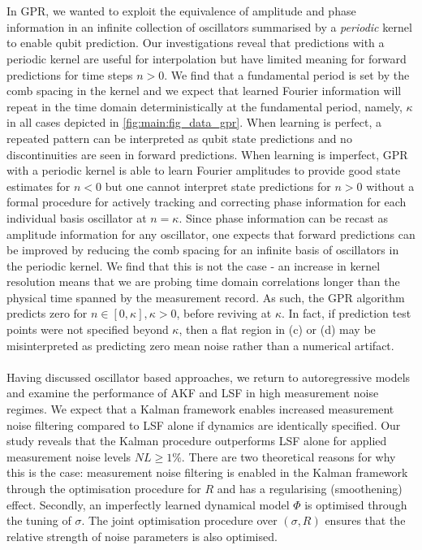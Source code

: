 \\
\\
In GPR, we wanted to exploit the equivalence of amplitude and phase information in an infinite collection of oscillators summarised by a \textit{periodic} kernel to enable qubit prediction. Our investigations reveal that predictions with a periodic kernel are useful for interpolation but have limited meaning for forward predictions for time steps $n >0$.  We find that a fundamental period is set by the comb spacing in the kernel and we expect that learned Fourier information will repeat in the time domain deterministically at the fundamental period, namely, $\kappa$ in all cases depicted in \cref{fig:main:fig_data_gpr}. When learning is perfect, a repeated pattern can be interpreted as qubit state predictions and no discontinuities are seen in forward predictions. When learning is imperfect, GPR  with a periodic kernel is able to learn Fourier amplitudes to provide good state estimates for $n<0$ but one cannot interpret state predictions for $n>0$ without a formal procedure for actively tracking and correcting phase information for each individual basis oscillator at $n= \kappa$. Since phase information can be recast as amplitude information for any oscillator, one expects that forward predictions can be improved by reducing the comb spacing for an infinite basis of oscillators in the periodic kernel.  We find that this is not the case - an increase in kernel resolution means that we are probing time domain correlations longer than the physical time spanned by the measurement record. As such, the GPR algorithm predicts zero for $n \in [0, \kappa], \kappa > 0$, before reviving at $\kappa$.  In fact, if prediction test points were not specified beyond $\kappa$, then a flat region in (c) or (d) may be misinterpreted as predicting zero mean noise rather than a numerical artifact.
\\
\\
Having discussed oscillator based approaches, we return to autoregressive models and examine the performance of AKF and LSF in high measurement noise regimes. We expect that a Kalman framework enables increased measurement noise filtering compared to LSF alone if dynamics are identically specified.  Our study reveals that the Kalman procedure outperforms LSF alone for applied measurement noise levels $NL \geq 1\%$. There are two theoretical reasons for why this is the case: measurement noise filtering is enabled in the Kalman framework through the optimisation procedure for $R$ and has a regularising (smoothening) effect. Secondly, an imperfectly learned dynamical model $\Phi$ is optimised through the tuning of $\sigma$. The joint optimisation procedure over $(\sigma, R)$ ensures that the relative strength of noise parameters is also optimised.
